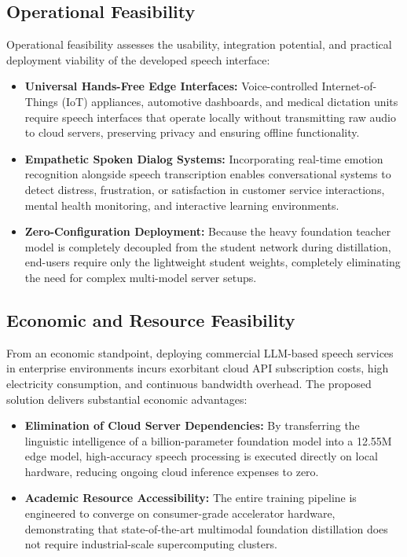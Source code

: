 \subsection{Operational Feasibility}
Operational feasibility assesses the usability, integration potential, and practical deployment viability of the developed speech interface:
\begin{itemize}
    \item \textbf{Universal Hands-Free Edge Interfaces:} Voice-controlled Internet-of-Things (IoT) appliances, automotive dashboards, and medical dictation units require speech interfaces that operate locally without transmitting raw audio to cloud servers, preserving privacy and ensuring offline functionality.
    \item \textbf{Empathetic Spoken Dialog Systems:} Incorporating real-time emotion recognition alongside speech transcription enables conversational systems to detect distress, frustration, or satisfaction in customer service interactions, mental health monitoring, and interactive learning environments.
    \item \textbf{Zero-Configuration Deployment:} Because the heavy foundation teacher model is completely decoupled from the student network during distillation, end-users require only the lightweight student weights, completely eliminating the need for complex multi-model server setups.
\end{itemize}

\subsection{Economic and Resource Feasibility}
From an economic standpoint, deploying commercial LLM-based speech services in enterprise environments incurs exorbitant cloud API subscription costs, high electricity consumption, and continuous bandwidth overhead. The proposed solution delivers substantial economic advantages:
\begin{itemize}
    \item \textbf{Elimination of Cloud Server Dependencies:} By transferring the linguistic intelligence of a billion-parameter foundation model into a 12.55M edge model, high-accuracy speech processing is executed directly on local hardware, reducing ongoing cloud inference expenses to zero.
    \item \textbf{Academic Resource Accessibility:} The entire training pipeline is engineered to converge on consumer-grade accelerator hardware, demonstrating that state-of-the-art multimodal foundation distillation does not require industrial-scale supercomputing clusters.
\end{itemize}


